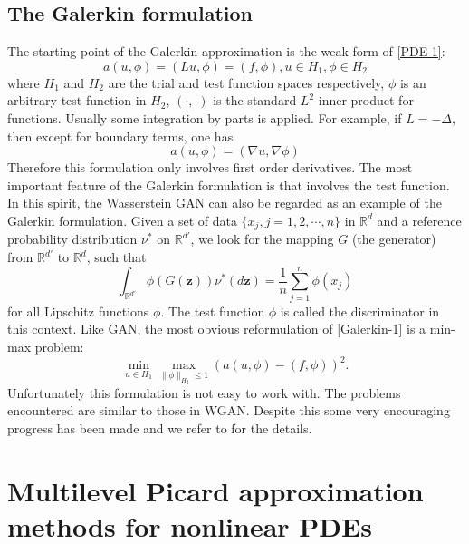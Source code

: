 \documentclass[12pt]{article}
\theoremstyle{definition}
\newcommand{\R}{\mathbb{R}}
\newcommand{\bx}{{x}}
\newcommand{\bz}{\bm{z}}
\newcommand{\be}{\begin{equation}}
\newcommand{\ee}{\end{equation}}
\begin{document}
\subsection{The Galerkin formulation}
The starting point of the Galerkin approximation is the weak form of 
\eqref{PDE-1}:
\be
a(u, \phi)  =  (Lu, \phi) = (f, \phi), u \in H_1, \phi \in H_2
\label{Galerkin-1}
\ee
where $H_1$ and $H_2$ are the trial and test function spaces respectively,
$\phi$ is an arbitrary test function in $H_2$, 
$(\cdot, \cdot) $ is the standard $L^2$ inner product for functions. 
Usually some integration by parts is applied.  For example, if $L = - \Delta$, then
except for boundary terms, one has
\be
a(u, \phi) = (\nabla u, \nabla \phi) 
\ee
Therefore this formulation only involves first order derivatives.
The most important feature of the Galerkin formulation is that involves
the test function.
In this spirit, the Wasserstein GAN can also be regarded as an example of the
Galerkin formulation. Given a set of data $\{\bx_j, j=1, 2, \cdots ,n\}$ in
$\R^d$ and a reference probability distribution $\nu^*$ on $\R^{d'}$,
we look for the mapping $G$ (the generator) from $\R^{d'}$ to $\R^d$,
such that \cite{arjovsky2017wgan}
\be
\int_{\R^{d'}} \phi(G(\bz)) \nu^*(d \bz) = \frac 1n \sum_{j=1}^n \phi(\bx_j)
\label{WGAN}
\ee
for all Lipschitz functions $\phi$. The test function $\phi$ is called the discriminator
in this context.
Like GAN, the most obvious reformulation of \eqref{Galerkin-1} is a min-max problem:
\be
\min_{u \in H_1} \max_{\|\phi\|_{H_2} \le 1} (a(u, \phi) - (f, \phi))^2.
\label{Galerkin-2}
\ee
Unfortunately this formulation is not easy to work with.
The problems encountered are similar to those in WGAN. 
Despite this some very encouraging progress has been made and we
 refer to \cite{Zang2020weak} for the details.


\section{Multilevel Picard approximation methods for nonlinear PDEs}
\label{sec:MLP}
\end{document}
